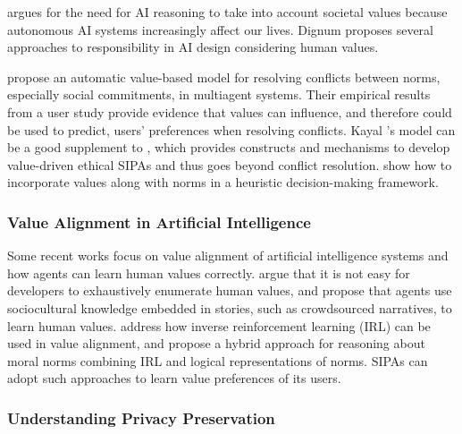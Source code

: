 \citet{dignum-ijcai17-responsible} argues for the need for AI reasoning to take into account societal values because autonomous AI systems increasingly affect our lives. Dignum proposes several approaches to responsibility in AI design considering human values. 

\citet{Kayal-TOIT18} propose an automatic value-based model for resolving conflicts between norms, especially social commitments, in multiagent systems. Their empirical results from a user study provide evidence that values can influence, and therefore could be used to predict, users' preferences when resolving conflicts. Kayal {\etal}'s \citep{Kayal-TOIT18} model can be a good supplement to \frameworkAinur, which provides constructs and mechanisms to develop value-driven ethical SIPAs and thus goes beyond conflict resolution. 
\citet{Serramia+18:values} show how to incorporate values along with norms in a heuristic decision-making framework.

\subsubsection{Value Alignment in Artificial Intelligence}

Some recent works focus on value alignment of artificial intelligence systems and how agents can learn human values correctly. 
\citet{RiedlHarrison2016Stories} argue that it is not easy for developers to exhaustively enumerate human values, and propose that agents use sociocultural knowledge embedded in stories, such as crowdsourced narratives, to learn human values. 
\citet{arnold-2017-value} address how inverse reinforcement learning (IRL) can be used in value alignment, and propose a hybrid approach for reasoning about moral norms combining IRL and logical representations of norms. \frameworkAinur SIPAs can adopt such approaches to learn value preferences of its users. 

\subsubsection{Understanding Privacy Preservation}

